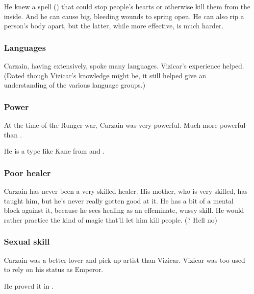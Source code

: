 He knew a spell (\qliphah) that could stop people's hearts or otherwise kill them from the inside. 
And he can cause big, bleeding wounds to spring open. 
He can also rip a person's body apart, but the latter, while more effective, is much harder. 





\subsubsection{Languages}
Carzain, having \travelled extensively, spoke many languages. 
Vizicar's experience helped. 
(Dated though Vizicar's knowledge might be, it still helped give an understanding of the various language groups.)





\subsubsection{Power}
At the time of the Runger war, Carzain was very powerful. 
Much more powerful than . 

He is a type like Kane from \cite{KarlEdwardWagner:GodsInDarkness} and \cite{KarlEdwardWagner:MidnightSun}. 





\subsubsection{Poor healer}
Carzain has never been a very skilled healer. 
His mother, who is very skilled, has taught him, but he's never really gotten good at it. 
He has a bit of a mental block against it, because he sees healing as an effeminate, wussy skill. 
He would rather practice the kind of magic that'll let him kill people. 
(? Hell no\prikker)




\subsubsection{Sexual skill}
Carzain was a better lover and pick-up artist than Vizicar. 
Vizicar was too used to rely on his status as Emperor. 

He proved it in . 

